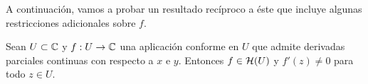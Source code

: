 \begin{comment} %
\begin{proof}
    Supongamos que $f(z)$ es una función holomorfa en $U$ tal que $f'(z) \not = 0$ para $z \in U$ y consideremos $f:z \to w = f(z)$. Sea $\gamma: [a,b] \to U$ una curva suave. Consideremos $\lambda = (f \circ  \gamma)(t)$. Por la regla de la cadena, $\lambda$ es continuamente diferenciable y como $f'(\gamma(t)) \not = 0$, tenemos
    \begin{equation}
        \label{eq:cadena}
        \lambda'(t) = f'(\gamma(t))\gamma'(t).
    \end{equation}

    Por lo tanto, $\lambda$ es una curva suave en el plano $w$.

    Sean $\gamma_1, \gamma_2: [a,b] \to U$ curvas suaves tales que $c=\gamma_1(a) = \gamma_2(a)$. Definimos el ángulo $\theta$ entre $\gamma_1$ y $\gamma_2$ en $c$ como el argumento de $\frac{\gamma_2'(a)}{\gamma_1'(a)}$, es decir,
    \begin{equation*}
        \dfrac{\gamma_2'(a)}{\gamma_1'(a)} = \abs{\dfrac{\gamma_2'(a)}{\gamma_1'(a)}} e^{i\theta}.
    \end{equation*}

    La aplicación $f$ lleva las curvas $\gamma_1$ y $\gamma_2$ en curvas suaves $\lambda_1=f(\gamma_1)$ y $\lambda_2=f(\gamma_2)$ que tienen como punto inicial $d=f(c)$. Por \eqref{eq:cadena} tenemos
    \begin{equation*}
        \dfrac{\lambda_2'(a)}{\lambda_1'(a)} = \dfrac{\gamma_2'(a)}{\gamma_1'(a)}
    \end{equation*}
    entonces el ángulo entre las curvas $\lambda_1$ y $\lambda_2$ en $d = \lambda_1(a) = \lambda_2(a)$ es igual al ángulo $\theta$ entre las curvas $\gamma_1$ y $\gamma_2$ en $c$. \\
\end{proof}
\end{comment}

A continuación, vamos a probar un resultado recíproco a éste que incluye algunas restricciones adicionales sobre $f$. \\

\begin{prop}
    Sean $U \subset \mathbb{C}$ y $f: U \to \mathbb{C}$ una aplicación conforme en $U$ que admite derivadas parciales continuas con respecto a $x$ e $y$. Entonces $f \in \mathcal{H}(U)$ y $f'(z) \not = 0$ para todo $z \in U$.
\end{prop}

